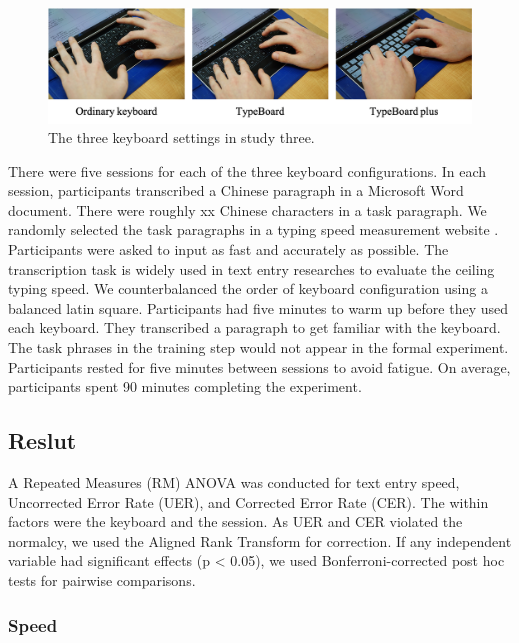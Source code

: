 \begin{figure}[!tbh]
	\includegraphics[width=1.0\linewidth]{figures/study3_illu.png}
	\centering
	\caption{The three keyboard settings in study three.}
	\label{fig:study3_illu}
\end{figure}

There were five sessions for each of the three keyboard configurations. In each session, participants transcribed a Chinese paragraph in a Microsoft Word document. There were roughly xx Chinese characters in a task paragraph. We randomly selected the task paragraphs in a typing speed measurement website \cite{Website-Typing}. Participants were asked to input as fast and accurately as possible. The transcription task is widely used in text entry researches \cite{2003-Metrics, 2003-Phrase, 2017-Word} to evaluate the ceiling typing speed.  We counterbalanced the order of keyboard configuration using a balanced latin square.
Participants had five minutes to warm up before they used each keyboard. They transcribed a paragraph to get familiar with the keyboard. The task phrases in the training step would not appear in the formal experiment. Participants rested for five minutes between sessions to avoid fatigue. On average, participants spent 90 minutes completing the experiment.

\subsection{Reslut}

A Repeated Measures (RM) ANOVA was conducted for text entry speed, Uncorrected Error Rate (UER), and Corrected Error Rate (CER). The within factors were the keyboard and the session. As UER and CER violated the normalcy, we used the Aligned Rank Transform \cite{2011-Aligned} for correction. If any independent variable had significant effects (p < 0.05), we used Bonferroni-corrected post hoc tests for pairwise comparisons.

\subsubsection{Speed}

